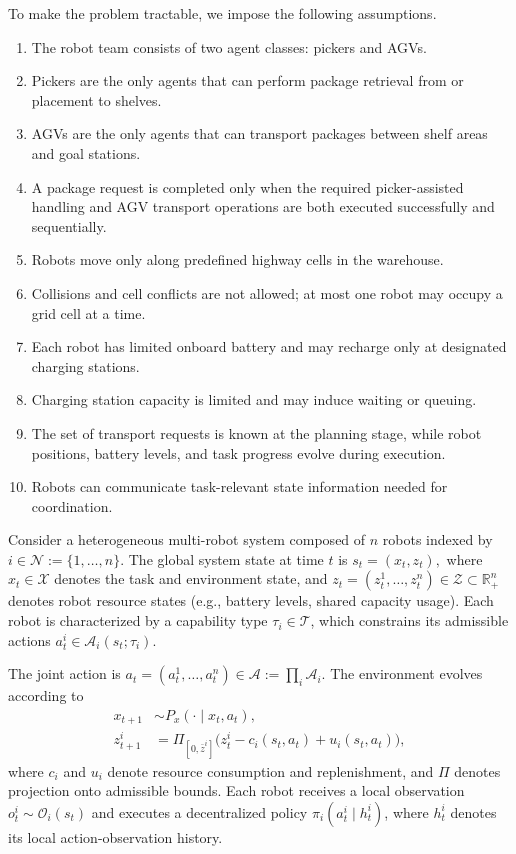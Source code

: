 \documentclass[Afour,sageh,times]{sagej}
\begin{document}
To make the problem tractable, we impose the following assumptions.
\begin{enumerate}
    \item The robot team consists of two agent classes: pickers and AGVs.
    \item Pickers are the only agents that can perform package retrieval from or placement to shelves.
    \item AGVs are the only agents that can transport packages between shelf areas and goal stations.
    \item A package request is completed only when the required picker-assisted handling and AGV transport operations are both executed successfully and sequentially.
    \item Robots move only along predefined highway cells in the warehouse.
    \item Collisions and cell conflicts are not allowed; at most one robot may occupy a grid cell at a time.
    \item Each robot has limited onboard battery and may recharge only at designated charging stations.
    \item Charging station capacity is limited and may induce waiting or queuing.
    \item The set of transport requests is known at the planning stage, while robot positions, battery levels, and task progress evolve during execution.
    \item Robots can communicate task-relevant state information needed for coordination.
\end{enumerate}

Consider a heterogeneous multi-robot system composed of $n$ robots indexed by $i \in \mathcal{N} := \{1,\dots,n\}$. The global system state at time $t$ is $s_t = (x_t, z_t),$ where $x_t \in \mathcal{X}$ denotes the task and environment state, and $z_t = (z_t^1,\dots,z_t^n) \in \mathcal{Z} \subset \mathbb{R}_+^n$ denotes robot resource states (e.g., battery levels, shared capacity usage). Each robot is characterized by a capability type $\tau_i \in \mathcal{T}$, which constrains its admissible actions $a_t^i \in \mathcal{A}_i(s_t;\tau_i)$.

The joint action is $a_t = (a_t^1,\dots,a_t^n) \in \mathcal{A} := \prod_i \mathcal{A}_i$. The environment evolves according to
\begin{align}
    x_{t+1} &\sim P_x(\cdot \mid x_t, a_t), \\
    z_{t+1}^i &= \Pi_{[0,\bar z^i]}
    \Big( z_t^i - c_i(s_t,a_t) + u_i(s_t,a_t) \Big),
\end{align}
where $c_i$ and $u_i$ denote resource consumption and replenishment, and $\Pi$ denotes projection onto admissible bounds. Each robot receives a local observation $o_t^i \sim \mathcal{O}_i(s_t)$ and executes a decentralized policy $\pi_i(a_t^i \mid h_t^i)$, where $h_t^i$ denotes its local action-observation history.  
\end{document}
